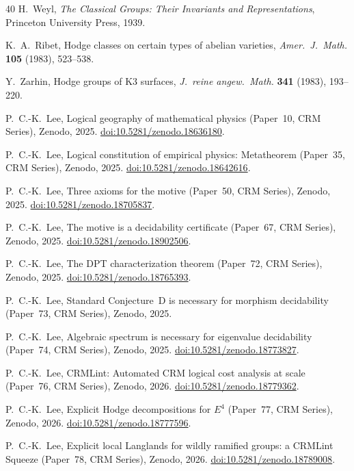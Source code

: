 \documentclass[11pt]{article}
\theoremstyle{plain}
\theoremstyle{definition}
\theoremstyle{remark}
\begin{document}
\begin{thebibliography}{40}
H.~Weyl,
\emph{The Classical Groups: Their Invariants and Representations},
Princeton University Press, 1939.

K.~A.~Ribet,
Hodge classes on certain types of abelian varieties,
\emph{Amer.\ J.\ Math.} \textbf{105} (1983), 523--538.

Y.~Zarhin,
Hodge groups of K3 surfaces,
\emph{J.\ reine angew.\ Math.} \textbf{341} (1983), 193--220.


P.~C.-K.\ Lee,
Logical geography of mathematical physics
(Paper~10, CRM Series),
Zenodo, 2025.
\href{https://doi.org/10.5281/zenodo.18636180}{doi:10.5281/zenodo.18636180}.

P.~C.-K.\ Lee,
Logical constitution of empirical physics: Metatheorem
(Paper~35, CRM Series),
Zenodo, 2025.
\href{https://doi.org/10.5281/zenodo.18642616}{doi:10.5281/zenodo.18642616}.

P.~C.-K.\ Lee,
Three axioms for the motive
(Paper~50, CRM Series),
Zenodo, 2025.
\href{https://doi.org/10.5281/zenodo.18705837}{doi:10.5281/zenodo.18705837}.

P.~C.-K.\ Lee,
The motive is a decidability certificate
(Paper~67, CRM Series),
Zenodo, 2025.
\href{https://doi.org/10.5281/zenodo.18902506}{doi:10.5281/zenodo.18902506}.

P.~C.-K.\ Lee,
The DPT characterization theorem
(Paper~72, CRM Series),
Zenodo, 2025.
\href{https://doi.org/10.5281/zenodo.18765393}{doi:10.5281/zenodo.18765393}.

P.~C.-K.\ Lee,
Standard Conjecture~D is necessary for morphism decidability
(Paper~73, CRM Series),
Zenodo, 2025.

P.~C.-K.\ Lee,
Algebraic spectrum is necessary for eigenvalue decidability
(Paper~74, CRM Series),
Zenodo, 2025.
\href{https://doi.org/10.5281/zenodo.18773827}{doi:10.5281/zenodo.18773827}.

P.~C.-K.\ Lee,
CRMLint: Automated CRM logical cost analysis at scale
(Paper~76, CRM Series),
Zenodo, 2026.
\href{https://doi.org/10.5281/zenodo.18779362}{doi:10.5281/zenodo.18779362}.

P.~C.-K.\ Lee,
Explicit Hodge decompositions for $E^4$
(Paper~77, CRM Series),
Zenodo, 2026.
\href{https://doi.org/10.5281/zenodo.18777596}{doi:10.5281/zenodo.18777596}.

P.~C.-K.\ Lee,
Explicit local Langlands for wildly ramified groups: a CRMLint Squeeze
(Paper~78, CRM Series),
Zenodo, 2026.
\href{https://doi.org/10.5281/zenodo.18789008}{doi:10.5281/zenodo.18789008}.


\end{thebibliography}
\end{document}
